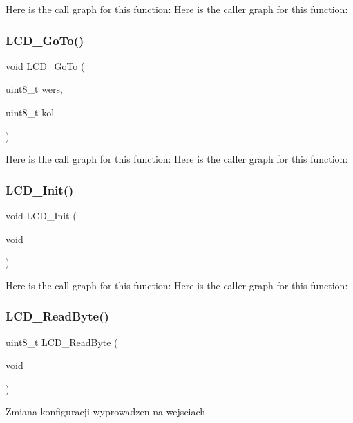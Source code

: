 Here is the call graph for this function\+:
Here is the caller graph for this function\+:
\mbox{\label{lcd4bit_8c_ae5e5bb0b14eca521d8b5f735ec5fa00c}} 
\subsubsection{L\+C\+D\+\_\+\+Go\+To()}
{\footnotesize\ttfamily void L\+C\+D\+\_\+\+Go\+To (\begin{DoxyParamCaption}\item[{uint8\+\_\+t}]{wers,  }\item[{uint8\+\_\+t}]{kol }\end{DoxyParamCaption})}

Here is the call graph for this function\+:
Here is the caller graph for this function\+:
\mbox{\label{lcd4bit_8c_aa53c9d40f3aa552a9974cd55ac510cb3}} 
\subsubsection{L\+C\+D\+\_\+\+Init()}
{\footnotesize\ttfamily void L\+C\+D\+\_\+\+Init (\begin{DoxyParamCaption}\item[{void}]{ }\end{DoxyParamCaption})}

Here is the call graph for this function\+:
Here is the caller graph for this function\+:
\mbox{\label{lcd4bit_8c_ab59396403153e41cf3c098b8bff86da6}} 
\subsubsection{L\+C\+D\+\_\+\+Read\+Byte()}
{\footnotesize\ttfamily uint8\+\_\+t L\+C\+D\+\_\+\+Read\+Byte (\begin{DoxyParamCaption}\item[{void}]{ }\end{DoxyParamCaption})}

Zmiana konfiguracji wyprowadzen na wejsciach

